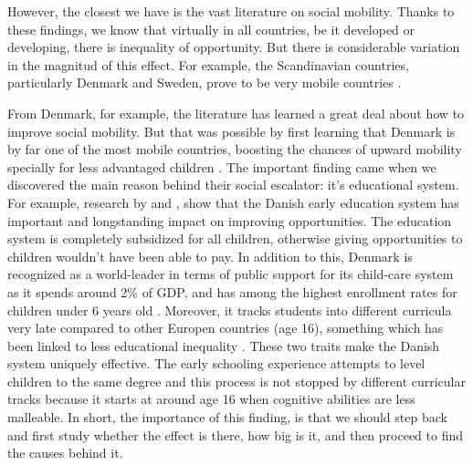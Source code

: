 \documentclass[11pt, a4paper]{article}\usepackage[]{graphicx}\usepackage[]{color}
\begin{document}
However, the closest we have is the vast literature on social mobility. Thanks to these findings, we know that virtually in all countries, be it developed or developing, there is inequality of opportunity. But there is considerable variation in the magnitud of this effect. For example, the Scandinavian countries, particularly Denmark and Sweden, prove to be very mobile countries \citep{esping2012, breen2007, shavit1993}.

From Denmark, for example, the literature has learned a great deal about how to improve social mobility. But that was possible by first learning that Denmark is by far one of the most mobile countries, boosting the chances of upward mobility specially for less advantaged children \citep{bjorklund2009, jaeger2007}. The important finding came when we discovered the main reason behind their social escalator: it's educational system. For example, research by \citet{esping_waldfogel2012} and \citet{bauchmuller2014}, show that the Danish early education system has important and longstanding impact on improving opportunities. The education system is completely subsidized for all children, otherwise giving opportunities to children wouldn't have been able to pay. In addition to this, Denmark is recognized as a world-leader in terms of public support for its child-care system as it spends around 2\% of GDP, and has among the highest enrollment rates for children under 6 years old \citep{esping_waldfogel2012}. Moreover, it tracks students into different curricula very late compared to other Europen countries (age 16), something which has been linked to less educational inequality \citep{hanushek_woesmann_tracking}. These two traits make the Danish system uniquely effective. The early schooling experience attempts to level children to the same degree and this process is not stopped by different curricular tracks because it starts at around age 16 when cognitive abilities are less malleable. In short, the importance of this finding, is that we should step back and first study whether the effect is there, how big is it, and then proceed to find the causes behind it.
\end{document}
